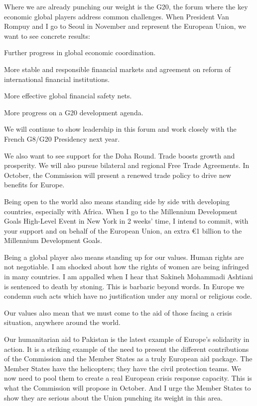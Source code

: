 \documentclass[a4paper,11pt]{article}
\begin{document}
Where we are already punching our weight is the G20, the forum where the key economic global players address common challenges. When President Van Rompuy and I go to Seoul in November and represent the European Union, we want to see concrete results:

Further progress in global economic coordination.

More stable and responsible financial markets and agreement on reform of international financial institutions.

More effective global financial safety nets.

More progress on a G20 development agenda.

We will continue to show leadership in this forum and work closely with the French G8/G20 Presidency next year.

We also want to see support for the Doha Round. Trade boosts growth and prosperity. We will also pursue bilateral and regional Free Trade Agreements. In October, the Commission will present a renewed trade policy to drive new benefits for Europe.

Being open to the world also means standing side by side with developing countries, especially with Africa. When I go to the Millennium Development Goals High-Level Event in New York in 2 weeks' time, I intend to commit, with your support and on behalf of the European Union, an extra \euro1 billion to the Millennium Development Goals.

Being a global player also means standing up for our values. Human rights are not negotiable. I am shocked about how the rights of women are being infringed in many countries. I am appalled when I hear that Sakineh Mohammadi Ashtiani is sentenced to death by stoning. This is barbaric beyond words. In Europe we condemn such acts which have no justification under any moral or religious code.

Our values also mean that we must come to the aid of those facing a crisis situation, anywhere around the world.

Our humanitarian aid to Pakistan is the latest example of Europe's solidarity in action. It is a striking example of the need to present the different contributions of the Commission and the Member States as a truly European aid package. The Member States have the helicopters; they have the civil protection teams. We now need to pool them to create a real European crisis response capacity. This is what the Commission will propose in October. And I urge the Member States to show they are serious about the Union punching its weight in this area.
\end{document}
